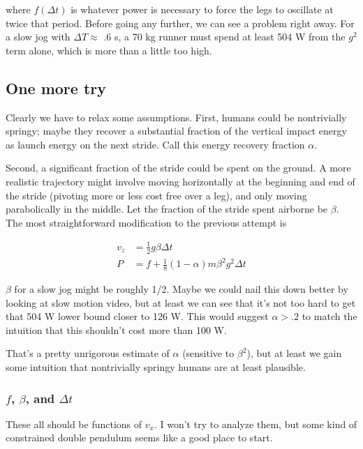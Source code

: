 \documentclass[12pt]{article}
\begin{document}
where \(f(\Delta t)\) is whatever power is necessary to force the legs to oscillate at twice that period. Before going any further, we can see a problem right away. For a slow jog with \(\Delta T \approx\) .6 s, a 70 kg runner must spend at least 504 W from the \(g^2\) term alone, which is more than a little too high. 

\subsection{One more try}

Clearly we have to relax some assumptions. First, humans could be nontrivially springy; maybe they recover a substantial fraction of the vertical impact energy as launch energy on the next stride. Call this energy recovery fraction \(\alpha\).

Second, a significant fraction of the stride could be spent on the ground. A more realistic trajectory might involve moving horizontally at the beginning and end of the stride (pivoting more or less cost free over a leg), and only moving parabolically in the middle. Let the fraction of the stride spent airborne be \(\beta\). The most straightforward modification to the previous attempt is

\begin{align*}
v_z &= \frac{1}{2}g\beta\Delta t \\[11pt]
P &= f + \frac{1}{8}(1-\alpha)m\beta^2 g^2 \Delta t
\end{align*}

\(\beta\) for a slow jog might be roughly 1/2. Maybe we could nail this down better by looking at slow motion video, but at least we can see that it's not too hard to get that 504 W lower bound closer to 126 W. This would suggest \(\alpha > .2\) to match the intuition that this shouldn't cost more than 100 W.

That's a pretty unrigorous estimate of \(\alpha\) (sensitive to \(\beta^2\)), but at least we gain some intuition that nontrivially springy humans are at least plausible.

\subsubsection{\(f\), \(\beta\), and \(\Delta t\)}

These all should be functions of \(v_x\). I won't try to analyze them, but some kind of constrained double pendulum seems like a good place to start. 
\end{document}
